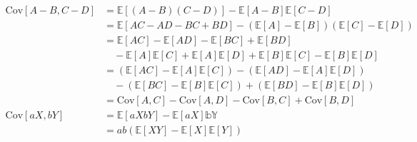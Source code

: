 \begin{align}
    \text{Cov}[A - B, C - D]                                            & = \mathbb{E}[(A - B)(C - D)] - \mathbb{E}[A - B]\mathbb{E}[C - D]                                                                                                                           \\
                                                                        & = \mathbb{E}[AC - AD - BC + BD] - (\mathbb{E}[A] - \mathbb{E}[B])(\mathbb{E}[C] - \mathbb{E}[D])                                                                                            \\
                                                                        & = \mathbb{E}[AC] - \mathbb{E}[AD] - \mathbb{E}[BC] + \mathbb{E}[BD]                                                                                                                         \\
                                                                        & \quad - \mathbb{E}[A]\mathbb{E}[C] + \mathbb{E}[A]\mathbb{E}[D] + \mathbb{E}[B]\mathbb{E}[C] - \mathbb{E}[B]\mathbb{E}[D]                                                                   \\
                                                                        & = (\mathbb{E}[AC] - \mathbb{E}[A]\mathbb{E}[C]) - (\mathbb{E}[AD] - \mathbb{E}[A]\mathbb{E}[D])                                                                                             \\
                                                                        & \quad - (\mathbb{E}[BC] - \mathbb{E}[B]\mathbb{E}[C]) + (\mathbb{E}[BD] - \mathbb{E}[B]\mathbb{E}[D])                                                                                       \\
                                                                        & = \text{Cov}[A, C] - \text{Cov}[A, D] - \text{Cov}[B, C] + \text{Cov}[B, D]                                                                                                                 \\
    \text{Cov}[aX, bY]                                                  & = \mathbb{E}[aXbY] - \mathbb{E}[aX]\mathbb{bY}                                                                                                                                              \\
                                                                        & = ab(\mathbb{E}[XY] - \mathbb{E}[X]\mathbb{E}[Y])                                                                                                                                           \\

\end{align}
